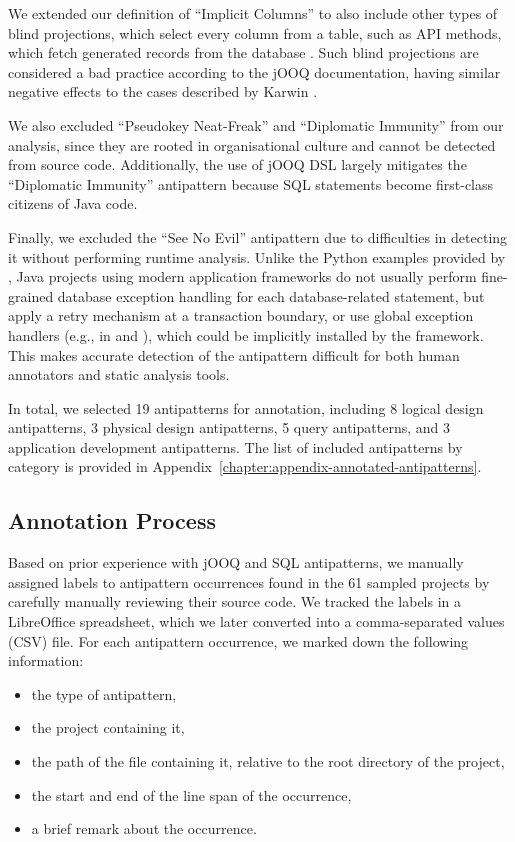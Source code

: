 We extended our definition of “Implicit Columns” to also include other types of blind projections, which select every column from a table, such as API methods, which fetch generated records from the database . Such blind projections are considered a bad practice according to the jOOQ documentation, having similar negative effects to the cases described by Karwin .

We also excluded “Pseudokey Neat-Freak” and “Diplomatic Immunity” from our analysis, since they are rooted in organisational culture and cannot be detected from source code. Additionally, the use of jOOQ DSL largely mitigates the “Diplomatic Immunity” antipattern because SQL statements become first-class citizens of Java code.

Finally, we excluded the “See No Evil” antipattern due to difficulties in detecting it without performing runtime analysis. Unlike the Python examples provided by , Java projects using modern application frameworks do not usually perform fine-grained database exception handling for each database-related statement, but apply a retry mechanism at a transaction boundary, or use global exception handlers (e.g., in \citealp{spring2026exceptionHandler} and \citealp{micronaut2026exceptionHandler}), which could be implicitly installed by the framework. This makes accurate detection of the antipattern difficult for both human annotators and static analysis tools.

In total, we selected 19 antipatterns for annotation, including 8 logical design antipatterns, 3 physical design antipatterns, 5 query antipatterns, and 3 application development antipatterns. The list of included antipatterns by category is provided in Appendix~\ref{chapter:appendix-annotated-antipatterns}.

\subsection{Annotation Process}

Based on prior experience with jOOQ and SQL antipatterns, we manually assigned labels to antipattern occurrences found in the 61 sampled projects by carefully manually reviewing their source code. We tracked the labels in a LibreOffice spreadsheet, which we later converted into a comma-separated values (CSV) file. For each antipattern occurrence, we marked down the following information:
\begin{itemize}
    \item the type of antipattern,
    \item the project containing it,
    \item the path of the file containing it, relative to the root directory of the project,
    \item the start and end of the line span of the occurrence,
    \item a brief remark about the occurrence.
\end{itemize}

